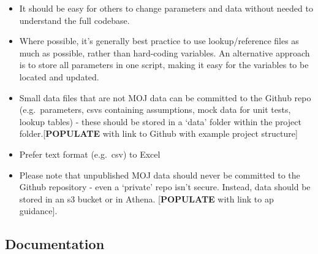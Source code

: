 \documentclass[]{book}
\begin{document}
\begin{itemize}
\item
  It should be easy for others to change parameters and data without needed to understand the full codebase.
\item
  Where possible, it's generally best practice to use lookup/reference files as much as possible, rather than hard-coding variables. An alternative approach is to store all parameters in one script, making it easy for the variables to be located and updated.
\item
  Small data files that are not MOJ data can be committed to the Github repo (e.g.~parameters, csvs containing assumptions, mock data for unit tests, lookup tables) - these should be stored in a `data' folder within the project folder.{[}\textbf{POPULATE} with link to Github with example project structure{]}
\item
  Prefer text format (e.g.~csv) to Excel
\item
  Please note that unpublished MOJ data should never be committed to the Github repository - even a `private' repo isn't secure. Instead, data should be stored in an s3 bucket or in Athena. {[}\textbf{POPULATE} with link to ap guidance{]}.
\end{itemize}

\hypertarget{readme}{%
\subsection*{Documentation}\label{readme}}
\end{document}

